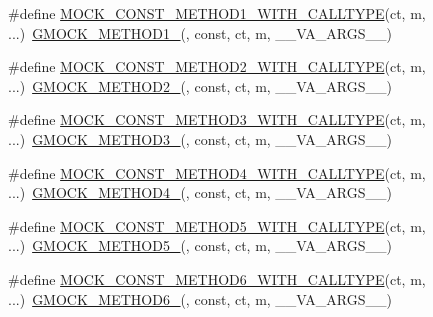 \begin{DoxyCompactItemize}
\item 
\#define \hyperlink{gmock-generated-function-mockers_8h_a94f4b0954d3d72011acf5f288ca40d42}{M\+O\+C\+K\+\_\+\+C\+O\+N\+S\+T\+\_\+\+M\+E\+T\+H\+O\+D1\+\_\+\+W\+I\+T\+H\+\_\+\+C\+A\+L\+L\+T\+Y\+PE}(ct,  m, ...)~\hyperlink{gmock-generated-function-mockers_8h_a1bc0012d62440dda77208dabdf4925c9}{G\+M\+O\+C\+K\+\_\+\+M\+E\+T\+H\+O\+D1\+\_\+}(, const, ct, m, \+\_\+\+\_\+\+V\+A\+\_\+\+A\+R\+G\+S\+\_\+\+\_\+)
\item 
\#define \hyperlink{gmock-generated-function-mockers_8h_a7c0507949996b9bae8b03fb6ea90d7a4}{M\+O\+C\+K\+\_\+\+C\+O\+N\+S\+T\+\_\+\+M\+E\+T\+H\+O\+D2\+\_\+\+W\+I\+T\+H\+\_\+\+C\+A\+L\+L\+T\+Y\+PE}(ct,  m, ...)~\hyperlink{gmock-generated-function-mockers_8h_a885295ca6bebb15efb3fc786218c5d47}{G\+M\+O\+C\+K\+\_\+\+M\+E\+T\+H\+O\+D2\+\_\+}(, const, ct, m, \+\_\+\+\_\+\+V\+A\+\_\+\+A\+R\+G\+S\+\_\+\+\_\+)
\item 
\#define \hyperlink{gmock-generated-function-mockers_8h_ac10e04e26db63b6c2a452e05d3c89db8}{M\+O\+C\+K\+\_\+\+C\+O\+N\+S\+T\+\_\+\+M\+E\+T\+H\+O\+D3\+\_\+\+W\+I\+T\+H\+\_\+\+C\+A\+L\+L\+T\+Y\+PE}(ct,  m, ...)~\hyperlink{gmock-generated-function-mockers_8h_af7c77ba511c631de02bb8c45a6ed3045}{G\+M\+O\+C\+K\+\_\+\+M\+E\+T\+H\+O\+D3\+\_\+}(, const, ct, m, \+\_\+\+\_\+\+V\+A\+\_\+\+A\+R\+G\+S\+\_\+\+\_\+)
\item 
\#define \hyperlink{gmock-generated-function-mockers_8h_a15229a3933a49f5099ee010c6dcaadeb}{M\+O\+C\+K\+\_\+\+C\+O\+N\+S\+T\+\_\+\+M\+E\+T\+H\+O\+D4\+\_\+\+W\+I\+T\+H\+\_\+\+C\+A\+L\+L\+T\+Y\+PE}(ct,  m, ...)~\hyperlink{gmock-generated-function-mockers_8h_ab6430f2cfad9de4aca5258ea559294bb}{G\+M\+O\+C\+K\+\_\+\+M\+E\+T\+H\+O\+D4\+\_\+}(, const, ct, m, \+\_\+\+\_\+\+V\+A\+\_\+\+A\+R\+G\+S\+\_\+\+\_\+)
\item 
\#define \hyperlink{gmock-generated-function-mockers_8h_a8d5e56fa6111cd7ee468e6dacf8691b9}{M\+O\+C\+K\+\_\+\+C\+O\+N\+S\+T\+\_\+\+M\+E\+T\+H\+O\+D5\+\_\+\+W\+I\+T\+H\+\_\+\+C\+A\+L\+L\+T\+Y\+PE}(ct,  m, ...)~\hyperlink{gmock-generated-function-mockers_8h_a9e3ecd392499ab19a4a6d3adcabf56f6}{G\+M\+O\+C\+K\+\_\+\+M\+E\+T\+H\+O\+D5\+\_\+}(, const, ct, m, \+\_\+\+\_\+\+V\+A\+\_\+\+A\+R\+G\+S\+\_\+\+\_\+)
\item 
\#define \hyperlink{gmock-generated-function-mockers_8h_a2d904ee47040f643e7b534c22603dd90}{M\+O\+C\+K\+\_\+\+C\+O\+N\+S\+T\+\_\+\+M\+E\+T\+H\+O\+D6\+\_\+\+W\+I\+T\+H\+\_\+\+C\+A\+L\+L\+T\+Y\+PE}(ct,  m, ...)~\hyperlink{gmock-generated-function-mockers_8h_ad0ca7f6973a076d0af4c953f8ed91842}{G\+M\+O\+C\+K\+\_\+\+M\+E\+T\+H\+O\+D6\+\_\+}(, const, ct, m, \+\_\+\+\_\+\+V\+A\+\_\+\+A\+R\+G\+S\+\_\+\+\_\+)

\end{DoxyCompactItemize}
